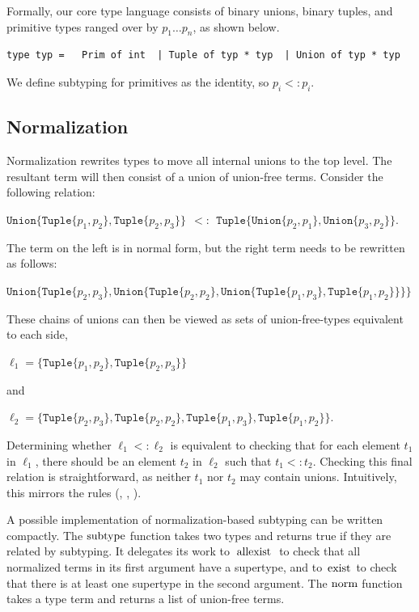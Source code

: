 \documentclass[a4paper,english]{lipics-v2019}
\newcommand{\xt}[1]{\texttt{#1}}
\newcommand{\union}[2]{\xt{Union\{}#1,#2\xt{\}}}
\renewcommand{\c}[1]{\ensuremath{\text{\lstinline{#1}}}\xspace}
\newcommand{\tuple}[1]{\xt{Tuple\{}#1\xt{\}}}
\begin{document}
Formally, our core type language consists of binary unions, binary tuples, and
primitive types ranged over by $p_1 \dots p_n$, as shown below.

\medskip
\begin{lstlisting}
type typ =   Prim of int  | Tuple of typ * typ  | Union of typ * typ
\end{lstlisting}
\medskip

We define subtyping for primitives as the identity, so $p_i <: p_i$.

\subsection{Normalization}\label{normalize}

Normalization rewrites types to move all internal unions to the top level. The
resultant term will then consist of a union of union-free terms. Consider the
following relation:

\medskip
$\union{ \tuple{p_1,p_2}}{\tuple{p_2,p_3}} ~~ <:~~  \tuple{ \union{p_2}{p_1}, \union{p_3}{p_2}}$.
\medskip

\noindent
The term on the left is in normal form, but the right term  needs to be
rewritten as follows:

\medskip
$\union{ \tuple{p_2,p_3}}
  {\union{ \tuple{p_2,p_2}}
    {\union{ \tuple{p_1,p_3}}
           {\tuple{p_1,p_2}}}}$
\medskip

\noindent
These chains of unions can then be viewed as sets of union-free-types
equivalent to each side,

\medskip
$\ell_1 = \{  \tuple{p_1,p_2}, \tuple{p_2,p_3}  \}$
\medskip

\noindent and

\medskip
$\ell_2 = \{  \tuple{p_2,p_3}, \tuple{p_2,p_2}, \tuple{p_1,p_3}, 
          \tuple{p_1,p_2} \}$.
\medskip

\noindent Determining whether $\ell_1 <: \ell_2$ is equivalent to checking that for each element $t_1$ in $\ell_1$, there should be an element $t_2$ in $\ell_2$ such
that $t_1 <: t_2$. Checking this final relation is straightforward, as neither
$t_1$ nor $t_2$ may contain unions. Intuitively, this mirrors the 
rules ({\sc [allexist]}, {\sc [existL/R]}, {\sc [tuple]}). 

A possible implementation of normalization-based subtyping can be written
compactly.  The \c{subtype} function takes two types and returns true if
they are related by subtyping. It delegates its work to \c{allexist} to
check that all normalized terms in its first argument have a supertype, and
to \c{exist} to check that there is at least one supertype in the second
argument.  The \c{norm} function takes a type term and returns a list of
union-free terms.
\end{document}
